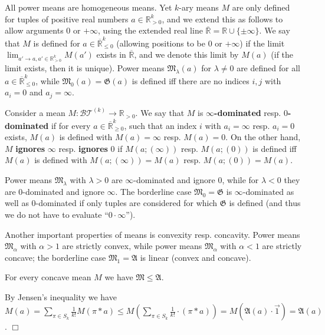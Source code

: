 \documentclass{report}
\begin{document}
\begin{enumerate}
\begin{enumerate}
				All power means are homogeneous means. Yet $k$-ary means $M$ are only
				defined for tuples of positive real numbers $a \in \mathbb{R}_{ >0}^ k
				$, and we extend this as follows
				to allow arguments 0 or $+\infty $, using the extended real line $\overline{\mathbb{R}} = {\mathbb{R}} \cup \{\pm \infty \}$. We
				say that $M$ is defined for $a \in \overline{\mathbb{R}}_{ \leq0}^ k$
				(allowing positions to be 0 or $+\infty $) if the
				limit $\lim _{a ' \to a,a' \in \mathbb{R}_{>0}^k} M(a')$ exists in $\overline{\mathbb{R}}$, and we denote this limit by $M(a)$ (if the
				limit exists, then it is unique). Power means $ \mathfrak{M} _\lambda (a)$ for $\lambda \neq0$ are defined for all
				$a \in \overline{\mathbb{R}}_{ \leq0}^ k$, while $\mathfrak{M}_ 0 (a) = \mathfrak{G}(a)$ is defined iff there are no indices $i,j $ with $a_i= 0$
				and $a _j = \infty $.
				
				{ Consider a mean $M : \mathcal{BT}^{(k)}
					\to {\mathbb{R}}_{>0}$. We say that $M$ is $\infty ${\bf -dominated} resp. 0{\bf -dominated} if for every $a \in \overline{\mathbb{R}}_{ \geq0}^ k$, such that an index $i$ with
					$a _i = \infty$ resp. $a_ i = 0$ exists, $M(a)$ is defined with $M(a) = \infty$ resp. $M(a) = 0$. On
					the other hand, $M$ {\bf ignores} $\infty$ resp. {\bf ignores} 0 if $M(a;(\infty ))$ resp. $M(a;(0))$ is
					defined iff $M(a)$ is defined with $M(a;(\infty )) = M(a)$ resp. $M(a;(0)) = M(a)$.}
				
				
				Power means $\mathfrak{M} _\lambda$ with $\lambda > 0$ are $\infty $-dominated and ignore 0, while for $\lambda < 0$
				they are 0-dominated and ignore $\infty $. The borderline case $\mathfrak{M}_ 0 = \mathfrak{G}$ is $\infty $-dominated
				as well as 0-dominated if only tuples are considered for which $\mathfrak{G}$ is defined (and
				thus we do not have to evaluate ``$0 \cdot \infty $'').
				
				Another important properties of means is convexity resp. concavity. Power
				means $\mathfrak{M }_\alpha$ with $\alpha > 1$ are strictly convex, while power means $\mathfrak{M}_\alpha$ with $\alpha < 1$ are
				strictly concave; the borderline case $\mathfrak{M}_1 = \mathfrak{A}$ is linear (convex and concave).
				
				{\lem For every concave mean $M$ we have $\mathfrak{M} \leq \mathfrak{A}$.}
				
				{\prf By Jensen's inequality we have $M(a) =\sum_{\pi \in S_k}\frac1{k!} M(\pi * a) \leq
					M( \sum_{\pi \in S_k}\frac1{k!}\cdot (\pi * a)) = M(\mathfrak{A}(a) \cdot \vec{1}) = \mathfrak{A}(a)$.} \hfill  $\Box$
				

\end{enumerate}
\end{enumerate}
\end{document}

